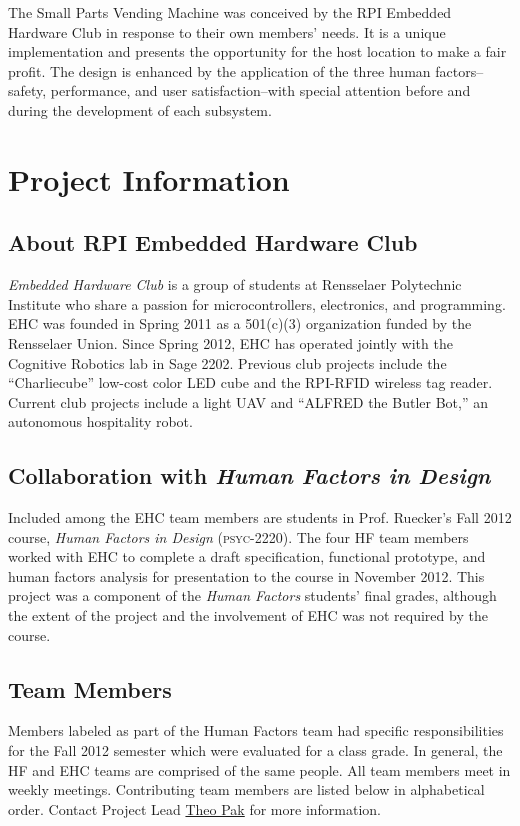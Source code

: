 \documentclass[12pt,draft,oneside]{article}
\begin{document}
The Small Parts Vending Machine was conceived by the RPI Embedded Hardware Club in response to their own members' needs. It is a unique implementation and presents the opportunity for the host location to make a fair profit. The design is enhanced by the application of the three human factors--safety, performance, and user satisfaction--with special attention before and during the development of each subsystem.


\section{Project Information}
\label{sec:info}

\subsection{About RPI Embedded Hardware Club}
\emph{Embedded Hardware Club} is a group of students at Rensselaer Polytechnic Institute who share a passion for microcontrollers, electronics, and programming. EHC was founded in Spring 2011 as a 501(c)(3) organization funded by the Rensselaer Union. Since Spring 2012, EHC has operated jointly with the Cognitive Robotics lab in Sage 2202. Previous club projects include the ``Charliecube'' low-cost color LED cube and the RPI-RFID wireless tag reader. Current club projects include a light UAV and ``ALFRED the Butler Bot,'' an autonomous hospitality robot. %

\subsection{Collaboration with \emph{Human Factors in Design}}
Included among the EHC team members are students in Prof. Ruecker's Fall 2012 course, \emph{Human Factors in Design} (\textsc{psyc-2220}). The four HF team members worked with EHC to complete a draft specification, functional prototype, and human factors analysis for presentation to the course in November 2012. This project was a component of the \emph{Human Factors} students' final grades, although the extent of the project and the involvement of EHC was not required by the course.

\subsection{Team Members}
Members labeled as part of the Human Factors team had specific responsibilities for the Fall 2012 semester which were evaluated for a class grade. In general, the HF and EHC teams are comprised of the same people. All team members meet in weekly meetings. Contributing team members are listed below in alphabetical order. Contact Project Lead \href{mailto:pakt@rpi.edu}{Theo Pak} for more information.
\end{document}
